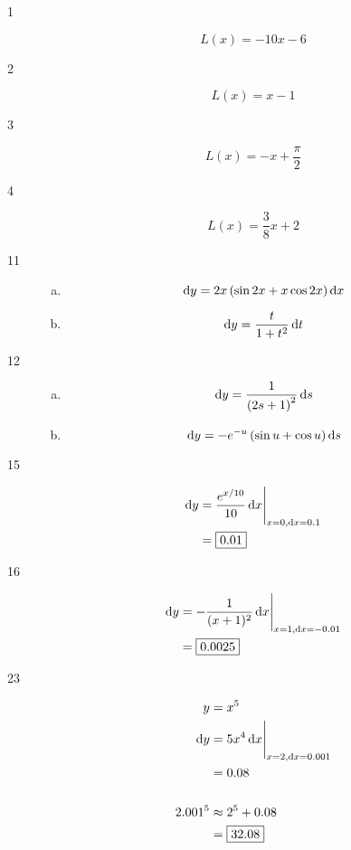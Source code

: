 \documentclass[letterpaper]{exam}
\newcommand{\dx}{\dif x}
\newcommand{\dy}{\dif y}
\begin{document}
  \begin{description}
    \item[1] 
      \[
        L(x) = -10x - 6
      \]

    \item[2] 
      \[
        L(x) = x - 1
      \]

    \item[3] 
      \[
        L(x) = -x + \frac{\pi}{2} 
      \]

    \item[4] 
      \[
        L(x) = \frac{3}{8} x + 2
      \]

    \item[11]
      \begin{enumerate}[(a)]
        \item 
          \[
            \dy = 2x \del{ \sin 2x + x \cos 2x } \dx
          \]

        \item
          \[
            \dy = \frac{t}{1 + t^2} \dif t
          \]

      \end{enumerate}

    \item[12]
      \begin{enumerate}[(a)]
        \item 
          \[
            \dy = \frac{1}{\del{2s + 1}^2} \dif s
          \]

        \item
          \[
            \dy = - e^{-u} \del{\sin u + \cos u} \dif s
          \]

      \end{enumerate}

    \item[15]
      \begin{align*}
        \dy & = \eval{ \frac{e^{x/10}}{10} \dx }_{x = 0, \dx = 0.1} \\
            & = \boxed{ 0.01 } \\
      \end{align*}

    \item[16]
      \begin{align*}
        \dy & = \eval{ -\frac{1}{(x+1)^2} \dx }_{x = 1, \dx = -0.01} \\
            & = \boxed{ 0.0025 } \\
      \end{align*}

    \item[23]
      \begin{align*}
        y       & = x^5 \\
        \dy     & =  \eval{ 5x^4 \dx }_{x = 2, \dx = 0.001} \\
                & = 0.08 \\
        \\
        2.001^5 & \approx 2^5 + 0.08 \\
                & = \boxed{ 32.08 } \\
      \end{align*}


\end{description}
\end{document}
